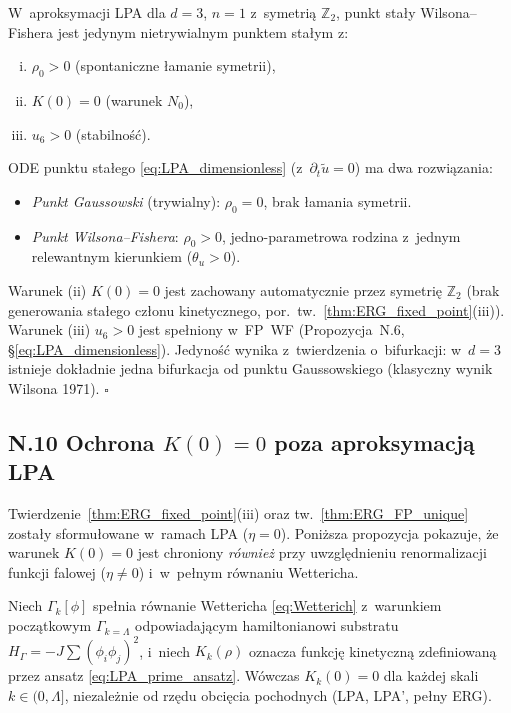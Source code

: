 \begin{twierdzenie}
\label{thm:ERG_FP_unique}
W~aproksymacji LPA dla $d=3$, $n=1$ z~symetri\k{a} $\mathbb{Z}_2$,
punkt sta\l{}y Wilsona--Fishera jest jedynym nietrywialnym punktem sta\l{}ym z:
\begin{enumerate}[(i),nosep]
  \item $\rho_0 > 0$ (spontaniczne \l{}amanie symetrii),
  \item $K(0) = 0$ (warunek $N_0$),
  \item $u_6 > 0$ (stabilno\'s\'c).
\end{enumerate}
\end{twierdzenie}

\begin{dowod}[szkic]
ODE punktu sta\l{}ego \eqref{eq:LPA_dimensionless} (z~$\partial_t \tilde u = 0$)
ma dwa rozwi\k{a}zania:
\begin{itemize}[nosep]
  \item \emph{Punkt Gaussowski} (trywialny): $\rho_0 = 0$, brak \l{}amania symetrii.
  \item \emph{Punkt Wilsona--Fishera}: $\rho_0 > 0$, jedno-parametrowa rodzina
    z~jednym relewantnym kierunkiem ($\theta_u > 0$).
\end{itemize}
Warunek (ii) $K(0) = 0$ jest zachowany automatycznie przez symetri\k{e} $\mathbb{Z}_2$
(brak generowania sta\l{}ego cz\l{}onu kinetycznego,
por.~tw.~\ref{thm:ERG_fixed_point}(iii)).
Warunek (iii) $u_6 > 0$ jest spe\l{}niony w~FP~WF
(Propozycja~N.6, \S\ref{eq:LPA_dimensionless}).
Jedyno\'s\'c wynika z~twierdzenia o~bifurkacji: w~$d=3$ istnieje dok\l{}adnie
jedna bifurkacja od punktu Gaussowskiego (klasyczny wynik Wilsona 1971).
\hfill$\square$
\end{dowod}

\subsection*{N.10 Ochrona $K(0)=0$ poza aproksymacj\k{a} LPA}
\label{sec:K0_beyond_LPA}

Twierdzenie~\ref{thm:ERG_fixed_point}(iii) oraz tw.~\ref{thm:ERG_FP_unique}
zosta\l{}y sformu\l{}owane w~ramach LPA ($\eta=0$).
Poni\.zsza propozycja pokazuje, \.ze warunek $K(0)=0$ jest chroniony
\emph{r\'ownie\.z} przy uwzgl\k{e}dnieniu renormalizacji funkcji falowej
($\eta \neq 0$) i~w~pe\l{}nym r\'ownaniu Wettericha.

\begin{propozycja}[Ochrona $K(0)=0$ poza LPA]
\label{prop:K0_beyond_LPA}
Niech $\Gamma_k[\phi]$ spe\l{}nia r\'ownanie Wettericha \eqref{eq:Wetterich}
z~warunkiem pocz\k{a}tkowym $\Gamma_{k=\Lambda}$ odpowiadaj\k{a}cym
hamiltonianowi substratu $H_\Gamma = -J\sum(\phi_i\phi_j)^2$,
i~niech $K_k(\rho)$ oznacza funkcj\k{e} kinetyczn\k{a} zdefiniowan\k{a}
przez ansatz \eqref{eq:LPA_prime_ansatz}.
W\'owczas $K_k(0) = 0$ dla ka\.zdej skali $k \in (0,\Lambda]$,
niezale\.znie od rz\k{e}du obci\k{e}cia pochodnych (LPA, LPA', pe\l{}ny ERG).
\end{propozycja}

